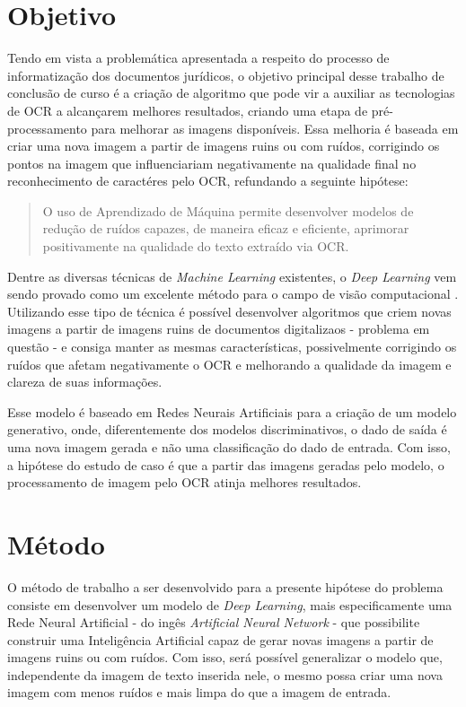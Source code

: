 \newpage

\section{Objetivo}

Tendo em vista a problemática apresentada a respeito do processo de informatização dos documentos jurídicos, o objetivo principal desse trabalho de conclusão de curso é a criação de algoritmo que pode vir a auxiliar as tecnologias de OCR a alcançarem melhores resultados, criando uma etapa de pré-processamento para melhorar as imagens disponíveis. Essa melhoria é baseada em criar uma nova imagem a partir de imagens ruins ou com ruídos, corrigindo os pontos na imagem que influenciariam negativamente na qualidade final no reconhecimento de caractéres pelo OCR, refundando a seguinte hipótese:

\begin{quote}
  O uso de Aprendizado de Máquina permite desenvolver modelos de redução de ruídos capazes, de maneira eficaz e eficiente, aprimorar positivamente na qualidade do texto extraído via OCR.
\end{quote}

Dentre as diversas técnicas de \textit{Machine Learning} existentes, o \textit{Deep Learning} vem sendo provado como um excelente método para o campo de visão computacional \cite{dl-brief-review}. Utilizando esse tipo de técnica é possível desenvolver algoritmos que criem novas imagens a partir de imagens ruins de documentos digitalizaos - problema em questão - e consiga manter as mesmas características, possivelmente corrigindo os ruídos que afetam negativamente o OCR e melhorando a qualidade da imagem e clareza de suas informações.

Esse modelo é baseado em Redes Neurais Artificiais para a criação de um modelo generativo, onde, diferentemente dos modelos discriminativos, o dado de saída é uma nova imagem gerada e não uma classificação do dado de entrada. Com isso, a hipótese do estudo de caso é que a partir das imagens geradas pelo modelo, o processamento de imagem pelo OCR atinja melhores resultados.

\section{Método}

O método de trabalho a ser desenvolvido para a presente hipótese do problema consiste em desenvolver um modelo de \textit{Deep Learning}, mais especificamente uma Rede Neural Artificial - do ingês \textit{Artificial Neural Network} - que possibilite construir uma Inteligência Artificial capaz de gerar novas imagens a partir de imagens ruins ou com ruídos. Com isso, será possível generalizar o modelo que, independente da imagem de texto inserida nele, o mesmo possa criar uma nova imagem com menos ruídos e mais limpa do que a imagem de entrada.

